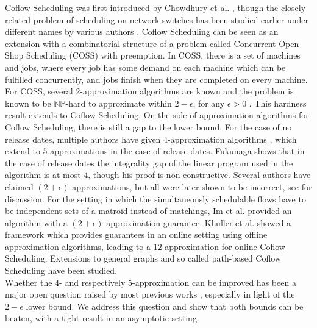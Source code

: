 \documentclass[11pt]{article}
\begin{document}
Coflow Scheduling was first introduced by Chowdhury et al. \cite{chowdhury_efficient_2014}, though the closely related problem of scheduling on network switches has been studied earlier under different names by various authors \cite{bonuccelli_incremental_1991,gupta_scheduling_1996}. Coflow Scheduling can be seen as an extension with a combinatorial structure of a problem called Concurrent Open Shop Scheduling (COSS) with preemption. In COSS, there is a set of machines and jobs, where every job has some demand on each machine which can be fulfilled concurrently, and jobs finish when they are completed on every machine. For COSS, several $2$-approximation algorithms are known \cite{garg_order_2007,leung_scheduling_2007, mastrolilli_minimizing_2010} and the problem is known to be $\mathbb{NP}$-hard to approximate within $2-\epsilon$, for any $\epsilon > 0$ \cite{Sachdeva2013}. This hardness result extends to Coflow Scheduling. On the side of approximation algorithms for Coflow Scheduling, there is still a gap to the lower bound. For the case of no release dates, multiple authors have given $4$-approximation algorithms \cite{agarwal_sincronia_2018, ahmadi_scheduling_2017, fukunaga22}, which extend to $5$-approximations in the case of release dates. Fukunaga \cite{fukunaga22} shows that in the case of release dates the integrality gap of the linear program used in the algorithm is at most $4$, though his proof is non-constructive. Several authors have claimed $(2+\epsilon)$-approximations, but all were later shown to be incorrect, see \cite{im2018tightapp, ahmadi_scheduling_2017} for discussion.
For the setting in which the simultaneously schedulable flows have to be independent sets of a matroid instead of matchings, Im et al. \cite{im19} provided an algorithm with a $(2+\epsilon)$-approximation guarantee.
Khuller et al. \cite{khuller_select_2019} showed a framework which provides guarantees in an online setting using offline approximation algorithms, leading to a $12$-approximation for online Coflow Scheduling. Extensions to general graphs \cite{jahanjou_asymptotically_2017} and so called path-based Coflow Scheduling \cite{eckl_minimization_2020} have been studied.\\

Whether the $4$- and respectively $5$-approximation can be improved has been a major open question raised by most previous works \cite{agarwal_sincronia_2018, fukunaga22}, especially in light of the $2-\epsilon$ lower bound. We address this question and show that both bounds can be beaten, with a tight result in an asymptotic setting.
\end{document}
